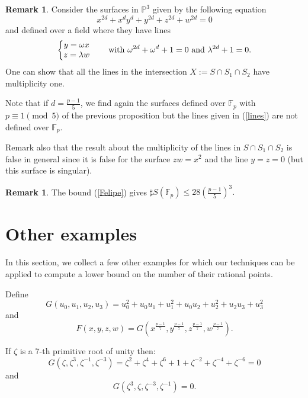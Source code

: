 \documentclass[12pt]{amsart}
\theoremstyle{definition}
\newtheorem{remark}[lemma]{Remark}
\begin{document}
\begin{remark}
Consider the surfaces in ${\mathbb P}^3$ given by the following equation
$$x^{2d}+x^dy^d+y^{2d}+z^{2d}+w^{2d}=0$$ 
and defined over a field 
 where they have lines 
 \begin{equation}\label{lines}
\left\{
\begin{matrix}
y = \omega x   \\
z = \lambda w \cr
\end{matrix}
\right.
\qquad
{\rm with}\  \omega^{2d}+\omega^d + 1=0\ {\rm and}\ \lambda^{2d}+1=0.
\end{equation}
One can show that all the lines in the intersection $X:=S\cap S_1 \cap S_2$ have multiplicity one.

Note that if $d=\frac{p-1}{5}$, we find again the surfaces defined over ${\mathbb F}_p$ with $p\equiv 1\pmod 5$ of the previous proposition but
the lines given in (\ref{lines}) are not defined over ${\mathbb F}_p$.


Remark also that the result about the multiplicity of the lines in $S\cap S_1 \cap S_2$ is false in general since it is false for the surface  $zw=x^2$ and the line $y=z=0$ (but this surface is singular).
\end{remark}

\begin{remark}
The bound (\ref{Felipe}) gives $\sharp S({\mathbb F}_p)\leq 28\left(\frac{p-1}{5}\right)^3.$
\end{remark}




\section{Other examples}

In this section, we collect a few other examples for which our techniques can be applied to compute a lower bound on the number of their rational points.

Define
$$
G\left(u_0, u_1, u_2, u_3\right)= u_0^2 + u_0 u_1+u_1^2+u_0 u_2 +u_2^2+u_2 u_3+u_3^2 
$$
and
$$
F\left(x, y, z, w\right)=G(x^{\frac{p-1}{7}}, y^{\frac{p-1}{7}}, z^{\frac{p-1}{7}}, w^{\frac{p-1}{7}}).
$$

If $\zeta$ is a 7-th primitive root of unity then:
$$
G\left(\zeta, \zeta^3, \zeta^{-1}, \zeta^{-3}\right)= \zeta^2+\zeta^4+\zeta^6+1 +\zeta^{-2}+\zeta^{-4}+\zeta^{-6}=0
$$
and
$$
G\left(\zeta^3, \zeta, \zeta^{-3}, \zeta^{-1}\right)=0.
$$
\end{document}
